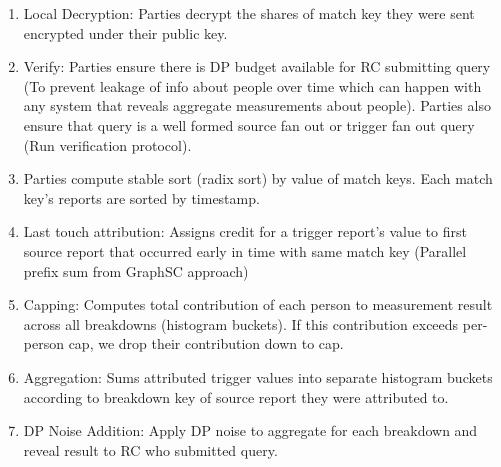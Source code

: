 \begin{enumerate}
   \item Local Decryption: Parties decrypt the shares of match key they were sent encrypted under their public key.
   \item Verify: Parties ensure there is DP budget available for RC submitting query (To prevent leakage of info about people over time which can happen with any system that reveals aggregate measurements about people). Parties also ensure that query is a well formed source fan out or trigger fan out query (Run verification protocol).
   \item Parties compute stable sort (radix sort) by value of match keys. Each match key's reports are sorted by timestamp. 
   \item Last touch attribution: Assigns credit for a trigger report's value to first source report that occurred early in time with same match key (Parallel prefix sum from GraphSC approach)
   \item Capping: Computes total contribution of each person to measurement result across all breakdowns (histogram buckets). If this contribution exceeds per-person cap, we drop their contribution down to cap.
   \item Aggregation: Sums attributed trigger values into separate histogram buckets according to breakdown key of source report they were attributed to.
   \item DP Noise Addition: Apply DP noise to aggregate for each breakdown and reveal result to RC who submitted query. 
\end{enumerate}




%
